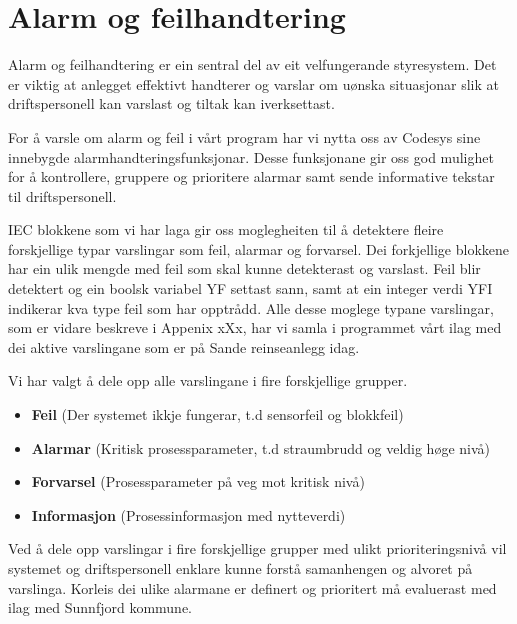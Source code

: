 \newpage
\section{Alarm og feilhandtering}
\thispagestyle{fancy}

Alarm og feilhandtering er ein sentral del av eit velfungerande styresystem. Det er viktig
at anlegget effektivt handterer og varslar om uønska situasjonar slik at 
driftspersonell kan varslast og tiltak kan iverksettast.

For å varsle om alarm og feil i vårt program har vi nytta oss av \gls{Codesys} sine
innebygde alarmhandteringsfunksjonar. Desse funksjonane gir oss god mulighet for å 
kontrollere, gruppere og prioritere alarmar samt sende informative tekstar til driftspersonell.

IEC blokkene som vi har laga gir oss moglegheiten til å detektere fleire forskjellige typar varslingar
som feil, alarmar og forvarsel.
Dei forkjellige blokkene har ein ulik mengde med feil som skal kunne detekterast og varslast.
Feil blir detektert og ein boolsk variabel YF settast sann, 
samt at ein integer verdi YFI indikerar kva type feil som har opptrådd.\newline
Alle desse moglege typane varslingar, som er vidare beskreve i Appenix xXx, 
har vi samla i programmet vårt ilag 
med dei aktive varslingane som er på Sande reinseanlegg idag.

Vi har valgt å dele opp alle varslingane i fire forskjellige grupper.

\begin{itemize}
    \item \textbf{Feil}          (Der systemet ikkje fungerar, t.d sensorfeil og blokkfeil)
    \item \textbf{Alarmar}       (Kritisk prosessparameter, t.d straumbrudd og veldig høge nivå)
    \item \textbf{Forvarsel}     (Prosessparameter på veg mot kritisk nivå)
    \item \textbf{Informasjon}   (Prosessinformasjon med nytteverdi)
\end{itemize}

Ved å dele opp varslingar i fire forskjellige grupper med ulikt prioriteringsnivå vil systemet
og driftspersonell enklare kunne forstå samanhengen og alvoret på varslinga. \newline
Korleis dei ulike alarmane er definert og prioritert må evaluerast med ilag med Sunnfjord kommune.


\newpage
